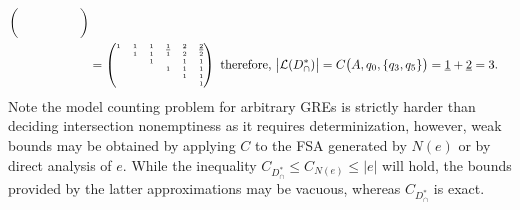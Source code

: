 \documentclass[sigplan,review,acmsmall,nonacm,screen,anonymous]{acmart}\settopmatter{printfolios=false,printccs=false,printacmref=false}
\begin{document}
\begin{align}
\begin{tiny}
\begin{pmatrix}
              &   &   &   &   &   \\
              &   &   &   &   &   \\
              &   &   &   &   &   \\
              &   &   &   &   &   \\
  \end{pmatrix}\end{tiny}\\
  &= \begin{tiny}\begin{pmatrix}
          1   & 1  & 1  & \underline{1} & 2 & \underline{2} \\
              & 1  & 1  & 1 & 2 & 2 \\
              &    & 1  &   & 1 & 1 \\
              &    &    & 1 & 1 & 1 \\
              &    &    &   & 1 & 1 \\
              &    &    &   &   & 1 \\
\end{pmatrix}\end{tiny} \text{ therefore, } \big|\mathcal{L}(D_\cap^*)\big| = C\big(A, q_0, \{q_3, q_5\}\big) = \underline{1} + \underline{2} = 3.
\end{align}
Note the model counting problem for arbitrary GREs is strictly harder than deciding intersection nonemptiness as it requires determinization, however, weak bounds may be obtained by applying $C$ to the FSA generated by $N(e)$ or by direct analysis of $e$. While the inequality $C_{D_\cap^*} \leq C_{N(e)} \leq |e|$ will hold, the bounds provided by the latter approximations may be vacuous, whereas $C_{D_\cap^*}$ is exact.
\end{document}
